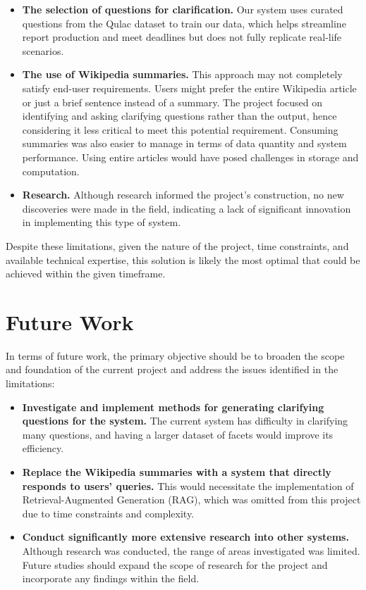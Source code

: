 \documentclass[11pt]{article}
\begin{document}
\begin{itemize}
    \item \textbf{The selection of questions for clarification.} Our system uses curated questions from the Qulac dataset to train our data, which helps streamline report production and meet deadlines but does not fully replicate real-life scenarios.
    
    \item \textbf{The use of Wikipedia summaries.} This approach may not completely satisfy end-user requirements. Users might prefer the entire Wikipedia article or just a brief sentence instead of a summary. The project focused on identifying and asking clarifying questions rather than the output, hence considering it less critical to meet this potential requirement. Consuming summaries was also easier to manage in terms of data quantity and system performance. Using entire articles would have posed challenges in storage and computation.
    
    \item \textbf{Research.} Although research informed the project's construction, no new discoveries were made in the field, indicating a lack of significant innovation in implementing this type of system.
\end{itemize}

Despite these limitations, given the nature of the project, time constraints, and available technical expertise, this solution is likely the most optimal that could be achieved within the given timeframe.

\section*{Future Work}

In terms of future work, the primary objective should be to broaden the scope and foundation of the current project and address the issues identified in the limitations:

\begin{itemize}
    \item \textbf{Investigate and implement methods for generating clarifying questions for the system.} The current system has difficulty in clarifying many questions, and having a larger dataset of facets would improve its efficiency.
    
    \item \textbf{Replace the Wikipedia summaries with a system that directly responds to users' queries.} This would necessitate the implementation of Retrieval-Augmented Generation (RAG), which was omitted from this project due to time constraints and complexity.
    
    \item \textbf{Conduct significantly more extensive research into other systems.} Although research was conducted, the range of areas investigated was limited. Future studies should expand the scope of research for the project and incorporate any findings within the field.
\end{itemize}
\end{document}
